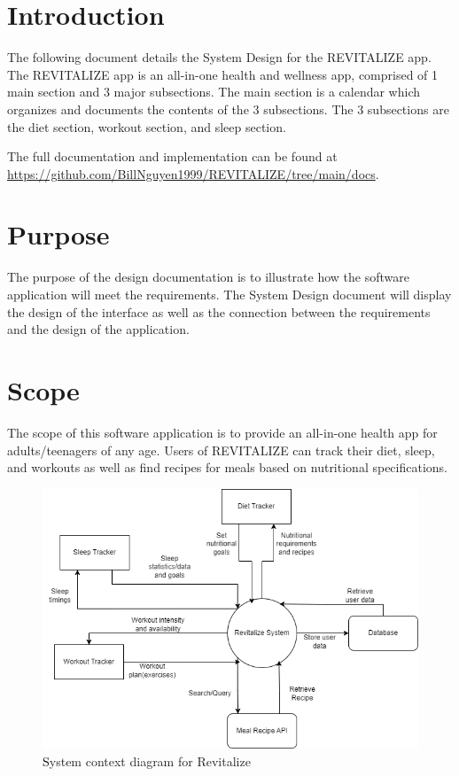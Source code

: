 \documentclass[12pt, titlepage]{article}
\begin{document}
\newpage

\tableofcontents

\newpage

\listoftables

\listoffigures

\newpage


\section{Introduction}
The following document details the System Design for
the REVITALIZE app. The REVITALIZE app is an all-in-one health and wellness app, comprised of 1 main 
section and 3 major subsections. The main section is a calendar which organizes and documents the contents of the 3 subsections. 
The 3 subsections are the diet section, workout section, and sleep section.

The full documentation and implementation can be
found at \url{https://github.com/BillNguyen1999/REVITALIZE/tree/main/docs}.


\section{Purpose}

The purpose of the design documentation is to illustrate how the software application will meet the requirements. The System Design document will display the design of the interface as well as the connection between the requirements and the design of the application. 


\section{Scope}

The scope of this software application is to provide an all-in-one health app for adults/teenagers of any age. Users of REVITALIZE can track their diet, sleep, and workouts as well as find recipes for meals based on nutritional specifications. 
\begin{figure}[H]
	\centering
	\includegraphics[scale=0.5]{system_diagrams/SystemContextDiagram.png}
	\caption{\textcolor{black} System context diagram for Revitalize}
\end{figure}
\end{document}
